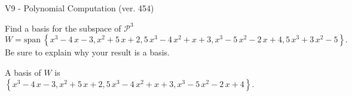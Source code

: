 \begin{exercise}
  \begin{exerciseTitle}V9 - Polynomial Computation (ver. 454)\end{exerciseTitle}
  \begin{exerciseStatement}
    Find a basis for the subspace of \(\mathcal{P}^3\) 
\[W=\mathrm{span}\ \left\{x^{3} - 4 \, x - 3 , x^{2} + 5 \, x + 2 , 5 \, x^{3} - 4 \, x^{2} + x + 3 , x^{3} - 5 \, x^{2} - 2 \, x + 4 , 5 \, x^{3} + 3 \, x^{2} - 5\right\}.\]
 Be sure to explain why your result is a basis.


  \end{exerciseStatement}
  \begin{exerciseAnswer}
   A basis of \(W\) is  \(\left\{x^{3} - 4 \, x - 3 , x^{2} + 5 \, x + 2 , 5 \, x^{3} - 4 \, x^{2} + x + 3 , x^{3} - 5 \, x^{2} - 2 \, x + 4\right\}\).
  


  \end{exerciseAnswer}
\end{exercise}
